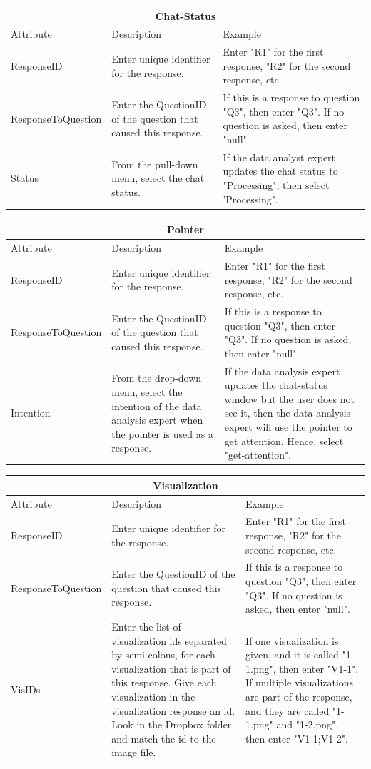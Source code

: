 \documentclass[]{article}
\begin{document}
\begin{itemize}
\begin{tabular}{ |p{4cm}|p{5cm}|p{5cm}|  }
\hline
\multicolumn{3}{|c|}{Chat-Status} \\
\hline
Attribute& Description & Example \\
\hline
ResponseID & Enter unique identifier for the response. & Enter "R1" for the first response, "R2" for the second response, etc. \\
ResponseToQuestion & Enter the QuestionID of the question that caused this response. & If this is a response to question "Q3", then enter "Q3". If no question is asked, then enter "null". \\
Status & From the pull-down menu, select the chat status. & If the data analyst expert updates the chat status to "Processing", then select 'Processing".\\
\hline
\end{tabular}

\begin{tabular}{ |p{4cm}|p{5cm}|p{5cm}|  }
\hline
\multicolumn{3}{|c|}{Pointer} \\
\hline
Attribute& Description & Example \\
\hline
ResponseID & Enter unique identifier for the response. & Enter "R1" for the first response, "R2" for the second response, etc. \\
ResponseToQuestion & Enter the QuestionID of the question that caused this response. & If this is a response to question "Q3", then enter "Q3". If no question is asked, then enter "null". \\
Intention & From the drop-down menu, select the intention of the data analysis expert when the pointer is used as a response. & If the data analysis expert updates the chat-status window but the user does not see it, then the data analysis expert will use the pointer to get attention. Hence, select "get-attention". \\
\hline
\end{tabular}

\begin{tabular}{ |p{4cm}|p{5cm}|p{5cm}|  }
\hline
\multicolumn{3}{|c|}{Visualization} \\
\hline
Attribute& Description & Example \\
\hline
ResponseID & Enter unique identifier for the response. & Enter "R1" for the first response, "R2" for the second response, etc. \\
ResponseToQuestion & Enter the QuestionID of the question that caused this response. & If this is a response to question "Q3", then enter "Q3". If no question is asked, then enter "null". \\
VisIDs & Enter the list of visualization ids separated by semi-colons, for each visualization that is part of this response. Give each visualization in the visualization response an id. Look in the Dropbox folder and match the id to the image file. & If one visualization is given, and it is called "1-1.png", then enter "V1-1". If multiple visualizations are part of the response, and they are called "1-1.png" and "1-2.png", then enter "V1-1;V1-2". \\
\hline
\end{tabular}


\end{itemize}
\end{document}
